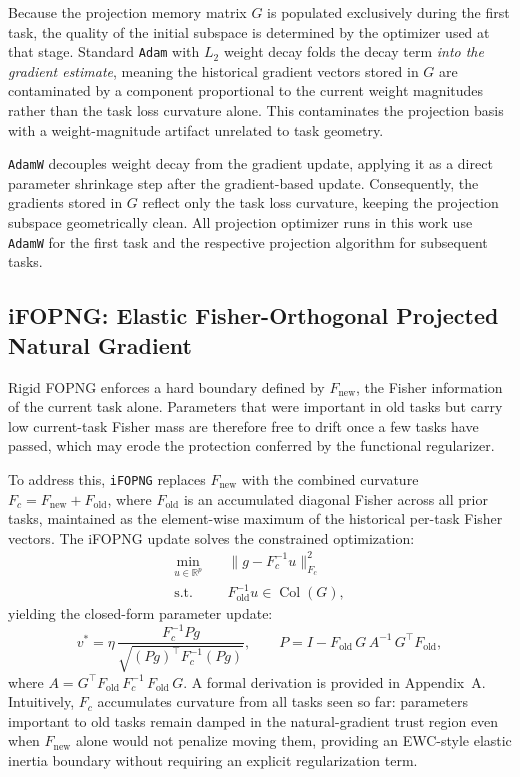 Because the projection memory matrix $G$ is populated exclusively during the
first task, the quality of the initial subspace is determined by the optimizer
used at that stage.  Standard \texttt{Adam} with $L_2$ weight decay folds the
decay term \emph{into the gradient estimate}, meaning the historical gradient
vectors stored in $G$ are contaminated by a component proportional to the
current weight magnitudes rather than the task loss curvature alone.  This
contaminates the projection basis with a weight-magnitude artifact unrelated to
task geometry.

\texttt{AdamW} \citep{loshchilov_decoupled_2019} decouples weight decay from
the gradient update, applying it as a direct parameter shrinkage step after the
gradient-based update.  Consequently, the gradients stored in $G$ reflect only
the task loss curvature, keeping the projection subspace geometrically clean.
All projection optimizer runs in this work use \texttt{AdamW} for the first task
and the respective projection algorithm for subsequent tasks.

\subsection{iFOPNG: Elastic Fisher-Orthogonal Projected Natural Gradient}
\label{sec:ifopng}

Rigid FOPNG enforces a hard boundary defined by $F_{\text{new}}$, the
Fisher information of the current task alone.  Parameters that were important
in old tasks but carry low current-task Fisher mass are therefore free to drift
once a few tasks have passed, which may erode the protection conferred by the
functional regularizer.

To address this, \texttt{iFOPNG} replaces $F_{\text{new}}$ with the combined
curvature $F_c = F_{\text{new}} + F_{\text{old}}$, where $F_{\text{old}}$ is an
accumulated diagonal Fisher across all prior tasks, maintained as the element-wise
maximum of the historical per-task Fisher vectors.  The iFOPNG update solves the
constrained optimization:
\begin{align}
    \min_{u \in \mathbb{R}^p} \quad
        & \| g - F_c^{-1} u \|_{F_c}^2 \\
    \text{s.t.} \quad
        & F_{\text{old}}^{-1} u \in \operatorname{Col}(G),
\end{align}
yielding the closed-form parameter update:
\begin{equation}
    v^* = \eta\,
        \frac{F_c^{-1} P g}{\sqrt{(Pg)^\top F_c^{-1} (Pg)}},
    \qquad
    P = I - F_{\text{old}}\,G\,A^{-1}\,G^\top F_{\text{old}},
    \label{eq:ifopng}
\end{equation}
where $A = G^\top F_{\text{old}}\,F_c^{-1}\,F_{\text{old}}\,G$.  A formal
derivation is provided in Appendix~A.  Intuitively, $F_c$ accumulates curvature
from all tasks seen so far: parameters important to old tasks remain damped in
the natural-gradient trust region even when $F_{\text{new}}$ alone would not
penalize moving them, providing an EWC-style elastic inertia boundary without
requiring an explicit regularization term.

